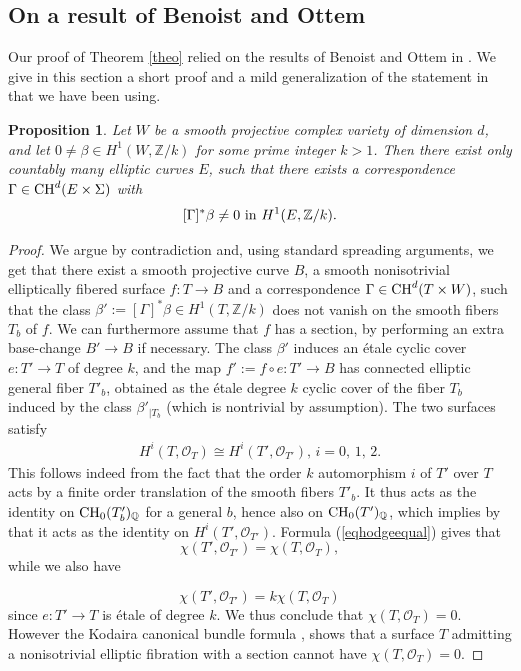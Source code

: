 \documentclass[10pt]{article}
\newtheorem{prop}[theo]{Proposition}
\begin{document}
\subsection{On a  result of Benoist and Ottem \label{secBO}}
Our proof of Theorem \ref{theo} relied on the results of Benoist and Ottem in \cite{benoistOttem}. We give in this section a short proof and a mild generalization of  the statement in \cite{benoistOttem} that we have been using.
\begin{prop} \label{propBOwithnewproof} Let $W$ be a smooth projective complex variety of dimension $d$,  and let $0\not=\beta\in H^1(W,\mathbb{Z}/k)$ for some prime  integer $k>1$. Then there exist only countably many elliptic curves $E$, such that there exists a correspondence $\Gamma\in {\rm CH}^d(E\times \Sigma)$ with
$$[\Gamma]^*\beta\not=0\,\,{\rm in }\,\,H^1(E,\mathbb{Z}/k).$$
\end{prop}
\begin{proof} We argue by contradiction and, using standard spreading arguments, we get that there exist a smooth projective curve $B$, a smooth nonisotrivial elliptically fibered   surface $f:T\rightarrow B$ and a correspondence
$\Gamma\in {\rm CH}^d(T\times W)$, such that the class
$\beta':=[\Gamma]^*\beta\in H^1(T,\mathbb{Z}/k)$ does not vanish on the smooth fibers $T_b$ of $f$. We can furthermore assume that $f$ has a section, by performing an extra  base-change $B'\rightarrow B$ if necessary.
The class $\beta'$ induces an étale cyclic cover
$e: T'\rightarrow T$ of degree $k$,
and the map $f':=f\circ e:T'\rightarrow B$ has connected elliptic general fiber $T'_b$, obtained as the  étale degree $k$ cyclic cover of the fiber $T_b$ induced by the class $\beta'_{\mid T_b}$ (which is  nontrivial by assumption). The two surfaces satisfy
\begin{eqnarray} \label{eqhodgeequal} H^i(T,\mathcal{O}_T)\cong H^i(T',\mathcal{O}_{T'}),\,i=0,\,1,\,2.\end{eqnarray}
This follows indeed from the fact that the order $k$ automorphism  $i$ of $T'$ over $T$ acts by a finite order translation of the smooth fibers $T'_b$. It thus  acts as the identity on ${\rm CH}_0(T'_b)_\mathbb{Q}$ for a general $b$, hence also  on ${\rm CH}_0(T')_\mathbb{Q}$, which implies  by \cite{mumford} that it acts as the identity on $H^i(T',\mathcal{O}_{T'})$.
Formula (\ref{eqhodgeequal}) gives that $$\chi(T',\mathcal{O}_{T'})=\chi(T,\mathcal{O}_{T}),$$ while we also have

$$\chi(T',\mathcal{O}_{T'})=k\chi(T,\mathcal{O}_{T})$$
since $e:T'\rightarrow T$ is étale of degree $k$.
We thus conclude that $\chi(T,\mathcal{O}_{T})=0$. However the Kodaira canonical bundle formula \cite{canobun1}, \cite{canobun2} shows that a surface $T$ admitting a nonisotrivial elliptic fibration with a section cannot have  $\chi(T,\mathcal{O}_{T})=0$.
\end{proof}
\end{document}

